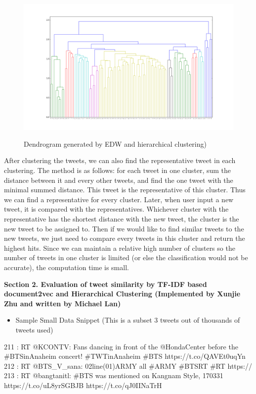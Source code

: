 \documentclass[10pt]{article}
\begin{document}
\begin{itemize}
\begin{figure}[h]
	\caption{Dendrogram generated by EDW and hierarchical clustering)}
	\centering
	\includegraphics[scale=0.3]{figure_1_hcluster.png}
	\label{fig1}
\end{figure}


After clustering the tweets, we can also find the representative tweet in each clustering. The method is as follows: for each tweet in one cluster, sum the distance between it and every other tweets, and find the one tweet with the minimal summed distance. This tweet is the representative of this cluster. Thus we can find a representative for every cluster. Later, when user input a new tweet, it is compared with the representatives. Whichever cluster with the representative has the shortest distance with the new tweet, the cluster is the new tweet to be assigned to. Then if we would like to find similar tweets to the new tweets, we just need to compare every tweets in this cluster and return the highest hits. Since we can maintain a relative high number of clusters so the number of tweets in one cluster is limited (or else the classification would not be accurate), the computation time is small.        

\end{itemize}
{\bf Section 2. Evaluation of tweet similarity by TF-IDF based document2vec and Hierarchical Clustering (Implemented by Xunjie Zhu and written by Michael Lan) }

\begin{itemize}
	\item Sample Small Data Snippet (This is a subset 3 tweets out of thousands of tweets used)
\end{itemize}
211 : RT @KCONTV: Fans dancing in front of the @HondaCenter before the \#BTSinAnaheim concert! \#TWTinAnaheim \#BTS https://t.co/QAVEt0uqYn
212 : RT @BTS\_V\_sana:   02line(01)ARMY  all    \#ARMY  \#BTSRT  \#RT https://
213 : RT @bangtanitl: \#BTS was mentioned on Kangnam Style, 170331 https://t.co/uL8yrSGBJB https://t.co/qJ0IINaTrH
\end{document}
